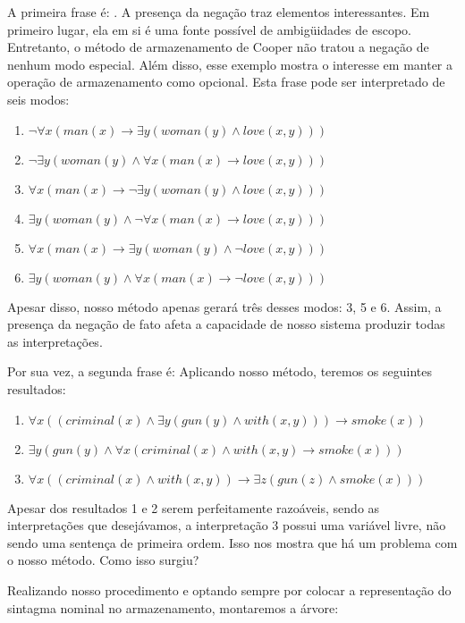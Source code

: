 A primeira frase é: . A presença da negação traz elementos interessantes. Em primeiro lugar, ela em si é uma fonte possível de ambigüidades de escopo. Entretanto, o método de armazenamento de Cooper não tratou a negação de nenhum modo especial. Além disso, esse exemplo mostra o interesse em manter a operação de armazenamento como opcional. Esta frase pode ser interpretado de seis modos:
\begin{enumerate}
\item $\neg \forall x (man(x) \rightarrow \exists y (woman(y) \land love(x,y))) $
\item $\neg \exists y(woman(y) \land \forall x(man(x) \rightarrow love(x,y)))$
\item $\forall x (man(x) \rightarrow \neg \exists y (woman(y) \land love(x,y)))$
\item $\exists y(woman(y) \land \neg \forall x(man(x) \rightarrow love(x,y)))$
\item $\forall x (man(x) \rightarrow \exists y (woman(y) \land \neg love(x,y)))$
\item $\exists y(woman(y) \land \forall x(man(x) \rightarrow \neg love(x,y)))$
\end{enumerate}

Apesar disso, nosso método apenas gerará três desses modos: 3, 5 e 6. Assim, a presença da negação de fato afeta a capacidade de nosso sistema produzir todas as interpretações.

Por sua vez, a segunda frase é:  Aplicando nosso método, teremos os seguintes resultados:
\begin{enumerate}
\item $\forall x((criminal(x) \land \exists y (gun(y) \land with(x,y))) \rightarrow smoke(x))$
\item $\exists y(gun(y) \land \forall x(criminal(x) \land with(x,y) \rightarrow smoke(x)))$
\item $\forall x((criminal(x) \land with(x,y)) \rightarrow \exists z(gun(z) \land smoke(x))) $
\end{enumerate}

Apesar dos resultados 1 e 2 serem perfeitamente razoáveis, sendo as interpretações que desejávamos, a interpretação 3 possui uma variável livre, não sendo uma sentença de primeira ordem. Isso nos mostra que há um problema com o nosso método. Como isso surgiu?

Realizando nosso procedimento e optando sempre por colocar a representação do sintagma nominal no armazenamento, montaremos a árvore: 

